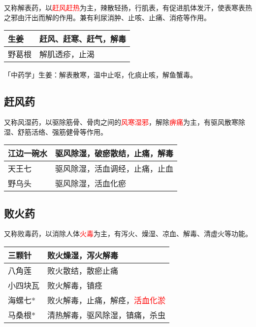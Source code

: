 \documentclass[cn,hazy,blue,12pt,normal,founder]{elegantnote}
\newcommand{\redt}[1]{\textcolor{red}{{}#1}}      %
\begin{document}
又称解表药，以\redt{赶风赶热}为主，辣散轻扬，行肌表，有促进肌体发汗，使表寒表热之邪由汗出而解的作用。兼有利尿消肿、止咳、止痛、消疮等作用。

\begin{table}[H]
  \begin{tabular}{|l|l|}
  \hline
  生姜 & 赶风、赶寒、赶气，解毒 \\ \hline
  野葛根 & 解肌透疹，止渴     \\ \hline
  \end{tabular}
\end{table}

\begin{note}
  「中药学」生姜：解表散寒，温中止呕，化痰止咳，解鱼蟹毒。
\end{note}

\subsection{赶风药}

又称风湿药，以驱除筋骨、骨肉之间的\redt{风寒湿邪}，解除\redt{痹痛}为主，有驱风散寒除湿、舒筋活络、强筋健骨等作用。

\begin{table}[H]
  \begin{tabular}{|l|l|}
  \hline
  江边一碗水  & 驱风除湿，破瘀散结，止痛，解毒 \\ \hline
  天王七     & 驱风除湿，活血调经，止痛，止血     \\ \hline
  野乌头     & 驱风除湿，活血化瘀               \\ \hline
  \end{tabular}
\end{table}

\subsection{败火药}

又称败毒药，以消除人体\redt{火毒}为主，有泻火、燥湿、凉血、解毒、清虚火等功能。

\begin{table}[H]
  \begin{tabular}{|l|l|}
  \hline
  三颗针    & 败火燥湿，泻火解毒     \\ \hline
  八角莲    & 败火散结，散瘀止痛     \\ \hline
  小四块瓦  & 败火解毒，镇痉         \\ \hline
  海螺七*    & 败火解毒，止痛，解痉，\redt{活血化淤}    \\ \hline
  马桑根*    & 清热解毒，驱风除湿，镇痛，杀虫   \\ \hline
  \end{tabular}
\end{table}
\end{document}
